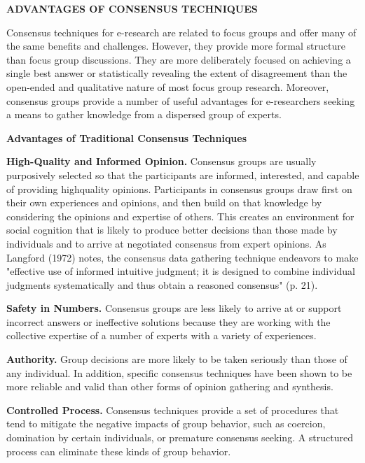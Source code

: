 \documentclass [8pt]{beamer}
\begin{document}
\begin{frame}
\justifying
\vspace{0.1cm}
{\large\textbf{ADVANTAGES OF CONSENSUS TECHNIQUES}}

Consensus techniques for e-research are related to focus groups and offer many of the same benefits and challenges. However, they provide more formal structure than focus group discussions. They are more deliberately focused on achieving a single best answer or statistically revealing the extent of disagreement than the open-ended and qualitative nature of most focus group research. Moreover, consensus groups provide a number of useful advantages for e-researchers seeking a means to gather knowledge from a dispersed group of experts.

\vspace{0.1cm}
{\large\textbf{Advantages of Traditional Consensus Techniques}}
\vspace{0.1cm}

\textbf{High-Quality and Informed Opinion.} Consensus groups are usually purposively selected so that the participants are informed, interested, and capable of providing highquality opinions. Participants in consensus groups draw first on their own experiences
and opinions, and then build on that knowledge by considering the opinions and expertise of others. This creates an environment for social cognition that is likely to produce better decisions than those made by individuals and to arrive at negotiated consensus from expert opinions. As Langford (1972) notes, the consensus data gathering technique endeavors to make "effective use of informed intuitive judgment; it is designed to combine individual judgments systematically and thus obtain a reasoned consensus" (p. 21).

\textbf{Safety in Numbers.} Consensus groups are less likely to arrive at or support incorrect answers or ineffective solutions because they are working with the collective expertise of a number of experts with a variety of experiences.

\textbf{Authority.} Group decisions are more likely to be taken seriously than those of any individual. In addition, specific consensus techniques have been shown to be more reliable and valid than other forms of opinion gathering and synthesis.

\textbf{Controlled Process.} Consensus techniques provide a set of procedures that tend to mitigate the negative impacts of group behavior, such as coercion, domination by certain individuals, or premature consensus seeking. A structured process can eliminate these kinds of group behavior.


\end{frame}
\end{document}
